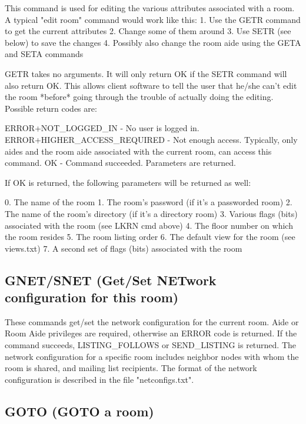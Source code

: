  This command is used for editing the various attributes associated with a
room.  A typical "edit room" command would work like this:
 1. Use the GETR command to get the current attributes
 2. Change some of them around
 3. Use SETR (see below) to save the changes
 4. Possibly also change the room aide using the GETA and SETA commands

 GETR takes no arguments.  It will only return OK if the SETR command will
also return OK.  This allows client software to tell the user that he/she
can't edit the room *before* going through the trouble of actually doing the
editing.  Possible return codes are:

 ERROR+NOT_LOGGED_IN          - No user is logged in.
 ERROR+HIGHER_ACCESS_REQUIRED - Not enough access.  Typically, only aides
and the room aide associated with the current room, can access this command.
 OK                           - Command succeeded.  Parameters are returned.

 If OK is returned, the following parameters will be returned as well:

 0. The name of the room
 1. The room's password (if it's a passworded room)
 2. The name of the room's directory (if it's a directory room)
 3. Various flags (bits) associated with the room (see LKRN cmd above)
 4. The floor number on which the room resides
 5. The room listing order
 6. The default view for the room (see views.txt)
 7. A second set of flags (bits) associated with the room



\subsection{GNET/SNET (Get/Set NETwork configuration for this room)}

 These commands get/set the network configuration for the current room.  Aide
or Room Aide privileges are required, otherwise an ERROR code is returned.
If the command succeeds, LISTING_FOLLOWS or SEND_LISTING is returned.  The
network configuration for a specific room includes neighbor nodes with whom
the room is shared, and mailing list recipients.  The format of the network
configuration is described in the file "netconfigs.txt".



\subsection{GOTO (GOTO a room)}

